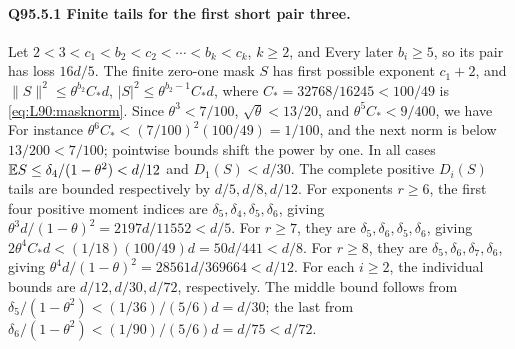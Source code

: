 \paragraph{Q95.5.1 Finite tails for the first short pair three.}
Let \(2<\allowbreak 3<\allowbreak c_1<\allowbreak b_2<\allowbreak c_2<\allowbreak \cdots<\allowbreak b_k<\allowbreak c_k\), \(k\ge\allowbreak 2\), and
Every later \(b_i\ge\allowbreak 5\), so its pair has loss \(16d/5\).
The finite zero-one mask \(S\) has first possible exponent \(c_1+2\),
and \(\|S\|^2\le\allowbreak \theta^{b_2}C_*d\),
\(|S|^2\le\allowbreak \theta^{b_2-1}C_*d\), where
\(C_*=\allowbreak 32768/16245<\allowbreak 100/49\) is \eqref{eq:L90:masknorm}.
Since \(\theta^3<\allowbreak 7/100\), \(\sqrt\theta<\allowbreak 13/20\), and
\(\theta^5C_*<\allowbreak 9/400\), we have
For instance \(\theta^6C_*<\allowbreak (7/100)^2(100/49)=\allowbreak 1/100\), and the next
norm is below \(13/200<\allowbreak 7/100\); pointwise bounds shift the power by one.
In all cases \(\mathbb E S\le\allowbreak \delta_4/(1-\theta^2)<\allowbreak d/12\) and
\(D_1(S)<\allowbreak d/30\). The complete positive \(D_i(S)\) tails are bounded
respectively by \(d/5,\allowbreak d/8,\allowbreak d/12\). For exponents \(r\ge\allowbreak 6\), the first
four positive moment indices are \(\delta_5,\allowbreak \delta_4,\allowbreak \delta_5,\allowbreak \delta_6\),
giving \(\theta^3d/(1-\theta)^2=\allowbreak 2197d/11552<\allowbreak d/5\).
For \(r\ge\allowbreak 7\), they are \(\delta_5,\allowbreak \delta_6,\allowbreak \delta_5,\allowbreak \delta_6\),
giving \(2\theta^4C_*d<\allowbreak (1/18)(100/49)d=\allowbreak 50d/441<\allowbreak d/8\).
For \(r\ge\allowbreak 8\), they are \(\delta_5,\allowbreak \delta_6,\allowbreak \delta_7,\allowbreak \delta_6\),
giving \(\theta^4d/(1-\theta)^2=\allowbreak 28561d/369664<\allowbreak d/12\).
For each \(i\ge\allowbreak 2\), the individual bounds are \(d/12,\allowbreak d/30,\allowbreak d/72\),
respectively. The middle bound follows from
\(\delta_5/(1-\theta^2)<\allowbreak (1/36)/(5/6)d=\allowbreak d/30\);
the last from \(\delta_6/(1-\theta^2)<\allowbreak (1/90)/(5/6)d=\allowbreak d/75<\allowbreak d/72\).

